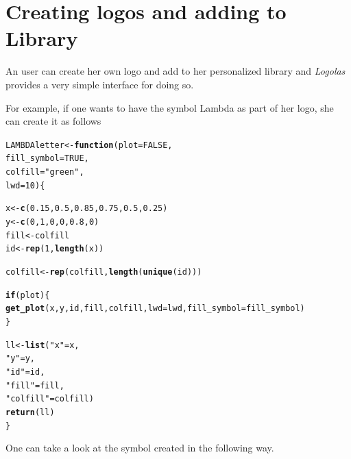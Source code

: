 \documentclass[12pt]{article}\usepackage[]{graphicx}\usepackage[usenames,dvipsnames]{color}
\makeatletter
\newcommand{\hlnum}[1]{\textcolor[rgb]{0.686,0.059,0.569}{#1}}%
\newcommand{\hlstr}[1]{\textcolor[rgb]{0.192,0.494,0.8}{#1}}%
\newcommand{\hlstd}[1]{\textcolor[rgb]{0.345,0.345,0.345}{#1}}%
\newcommand{\hlkwa}[1]{\textcolor[rgb]{0.161,0.373,0.58}{\textbf{#1}}}%
\newcommand{\hlkwb}[1]{\textcolor[rgb]{0.69,0.353,0.396}{#1}}%
\newcommand{\hlkwc}[1]{\textcolor[rgb]{0.333,0.667,0.333}{#1}}%
\newcommand{\hlkwd}[1]{\textcolor[rgb]{0.737,0.353,0.396}{\textbf{#1}}}%
\newenvironment{kframe}{%
 \def\at@end@of@kframe{}%
 \ifinner\ifhmode%
  \def\at@end@of@kframe{\end{minipage}}%
  \begin{minipage}{\columnwidth}%
 \fi\fi%
 \def\FrameCommand##1{\hskip\@totalleftmargin \hskip-\fboxsep
 \colorbox{shadecolor}{##1}\hskip-\fboxsep
     \hskip-\linewidth \hskip-\@totalleftmargin \hskip\columnwidth}%
 \MakeFramed {\advance\hsize-\width
   \@totalleftmargin\z@ \linewidth\hsize
   \@setminipage}}%
 {\par\unskip\endMakeFramed%
 \at@end@of@kframe}
\newenvironment{knitrout}{}{} %
\newcommand{\Logolas}{\textit{Logolas}}
\makeatother
\begin{document}
\newpage


\section{Creating logos and adding to Library}

An user can create her own logo and add to her personalized library and \Logolas{} provides a very simple interface for doing so.

For example, if one wants to have the symbol Lambda as part of her logo,
she can create it as follows

\begin{knitrout}
\color{fgcolor}\begin{kframe}
\begin{alltt}
\hlstd{LAMBDAletter} \hlkwb{<-} \hlkwa{function}\hlstd{(}\hlkwc{plot}\hlstd{=}\hlnum{FALSE}\hlstd{,}
                         \hlkwc{fill_symbol} \hlstd{=} \hlnum{TRUE}\hlstd{,}
                         \hlkwc{colfill}\hlstd{=}\hlstr{"green"}\hlstd{,}
                         \hlkwc{lwd}\hlstd{=}\hlnum{10}\hlstd{)\{}

  \hlstd{x} \hlkwb{<-} \hlkwd{c}\hlstd{(}\hlnum{0.15}\hlstd{,} \hlnum{0.5}\hlstd{,} \hlnum{0.85}\hlstd{,} \hlnum{0.75}\hlstd{,} \hlnum{0.5}\hlstd{,} \hlnum{0.25}\hlstd{)}
  \hlstd{y} \hlkwb{<-} \hlkwd{c}\hlstd{(}\hlnum{0}\hlstd{,} \hlnum{1}\hlstd{,} \hlnum{0}\hlstd{,} \hlnum{0}\hlstd{,} \hlnum{0.8}\hlstd{,} \hlnum{0}\hlstd{)}
  \hlstd{fill} \hlkwb{<-} \hlstd{colfill}
  \hlstd{id} \hlkwb{<-} \hlkwd{rep}\hlstd{(}\hlnum{1}\hlstd{,} \hlkwd{length}\hlstd{(x))}

  \hlstd{colfill} \hlkwb{<-} \hlkwd{rep}\hlstd{(colfill,} \hlkwd{length}\hlstd{(}\hlkwd{unique}\hlstd{(id)))}

  \hlkwa{if}\hlstd{(plot)\{}
    \hlkwd{get_plot}\hlstd{(x, y, id, fill, colfill,} \hlkwc{lwd} \hlstd{= lwd,} \hlkwc{fill_symbol} \hlstd{= fill_symbol)}
  \hlstd{\}}

  \hlstd{ll} \hlkwb{<-} \hlkwd{list}\hlstd{(}\hlstr{"x"}\hlstd{= x,}
             \hlstr{"y"}\hlstd{= y,}
             \hlstr{"id"} \hlstd{= id,}
             \hlstr{"fill"} \hlstd{= fill,}
             \hlstr{"colfill"} \hlstd{= colfill)}
  \hlkwd{return}\hlstd{(ll)}
\hlstd{\}}
\end{alltt}
\end{kframe}
\end{knitrout}

One can take a look at the symbol created in the following way.
\end{document}
